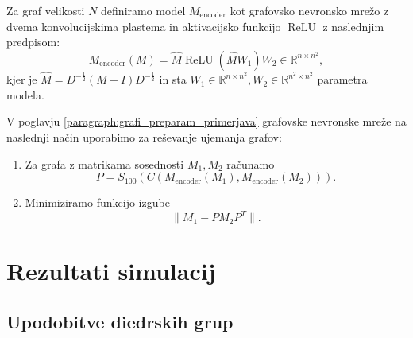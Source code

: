\documentclass[mat2, tisk]{fmfdelo}
\newcommand{\R}{\mathbb R}
\begin{document}
Za graf velikosti $N$ definiramo model $M_\text{encoder}$
kot grafovsko nevronsko mrežo z dvema konvolucijskima plastema
in aktivacijsko funkcijo $\operatorname{ReLU}$ z naslednjim predpisom:
$$
M_\text{encoder}(M) = \hat{M}
\operatorname{ReLU}(\hat{M}W_1)
W_2
\in \R^{n \times n^2},
$$
kjer je $\hat{M} = D^{-\frac{1}{2}}
(M + I) D^{-\frac{1}{2}}
$ in sta $W_1 \in \R^{n \times n^2}, W_2 \in \R^{n^2 \times n^2}$
parametra modela.
\begin{definicija}
  \label{def:ujemanje-GNN-sinkhorn}
  V poglavju
  \ref{paragraph:grafi_preparam_primerjava}
  grafovske nevronske mreže na naslednji
  način uporabimo za
  reševanje ujemanja grafov:
  \begin{enumerate}
    \item Za grafa z matrikama sosednosti $M_1, M_2$
      računamo
      $$P=S_{100}(C( M_\text{encoder}(M_1),
      M_\text{encoder}(M_2) )).$$
    \item Minimiziramo funkcijo izgube
      $$\|M_1 - PM_2 P^T\|.$$
  \end{enumerate}
\end{definicija}
%
%
%
\section{Rezultati simulacij}
\subsection{Upodobitve diedrskih grup}
\end{document}
